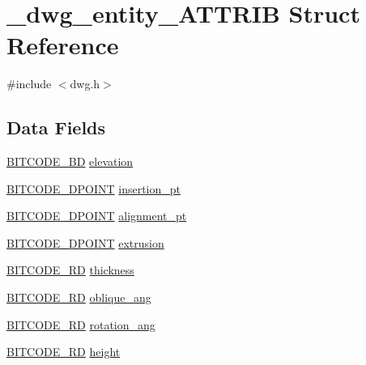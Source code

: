 \hypertarget{struct__dwg__entity__ATTRIB}{\section{\-\_\-dwg\-\_\-entity\-\_\-\-A\-T\-T\-R\-I\-B \-Struct \-Reference}
\label{struct__dwg__entity__ATTRIB}
}


{\ttfamily \#include $<$dwg.\-h$>$}

\subsection*{\-Data \-Fields}
\begin{DoxyCompactItemize}
\item 
\hyperlink{dwg_8h_a3c1e6781466b74ba07785d57da70ed97}{\-B\-I\-T\-C\-O\-D\-E\-\_\-\-B\-D} \hyperlink{struct__dwg__entity__ATTRIB_a85e86b7f42b1c4e5c328b6507c9c4fb8}{elevation}
\item 
\hyperlink{dwg_8h_ab0367188e20f79ebcdabfe27d7fdf47c}{\-B\-I\-T\-C\-O\-D\-E\-\_\-D\-P\-O\-I\-N\-T} \hyperlink{struct__dwg__entity__ATTRIB_a9d0e406b63cecf94fc604c03b10f8490}{insertion\-\_\-pt}
\item 
\hyperlink{dwg_8h_ab0367188e20f79ebcdabfe27d7fdf47c}{\-B\-I\-T\-C\-O\-D\-E\-\_\-D\-P\-O\-I\-N\-T} \hyperlink{struct__dwg__entity__ATTRIB_ac8b892029c9947fdb4deb717252021a3}{alignment\-\_\-pt}
\item 
\hyperlink{dwg_8h_a28caf4c2afeb01c45b68490ea6d81113}{\-B\-I\-T\-C\-O\-D\-E\-\_\-D\-P\-O\-I\-N\-T} \hyperlink{struct__dwg__entity__ATTRIB_a78125b208e27e97aa57cbfac0bdadd0c}{extrusion}
\item 
\hyperlink{dwg_8h_a309e7e59a4030a89943640d0d327cef7}{\-B\-I\-T\-C\-O\-D\-E\-\_\-\-R\-D} \hyperlink{struct__dwg__entity__ATTRIB_a0ff34ce652c7d6e99d73be4240d3106f}{thickness}
\item 
\hyperlink{dwg_8h_a309e7e59a4030a89943640d0d327cef7}{\-B\-I\-T\-C\-O\-D\-E\-\_\-\-R\-D} \hyperlink{struct__dwg__entity__ATTRIB_a419edb3a0b244118a32b9b05af8f9950}{oblique\-\_\-ang}
\item 
\hyperlink{dwg_8h_a309e7e59a4030a89943640d0d327cef7}{\-B\-I\-T\-C\-O\-D\-E\-\_\-\-R\-D} \hyperlink{struct__dwg__entity__ATTRIB_a2ebe512a48819f1552be4bb7355cb8d1}{rotation\-\_\-ang}
\item 
\hyperlink{dwg_8h_a309e7e59a4030a89943640d0d327cef7}{\-B\-I\-T\-C\-O\-D\-E\-\_\-\-R\-D} \hyperlink{struct__dwg__entity__ATTRIB_ae2f0e53051127492a7cca8716214d743}{height}

\end{DoxyCompactItemize}
